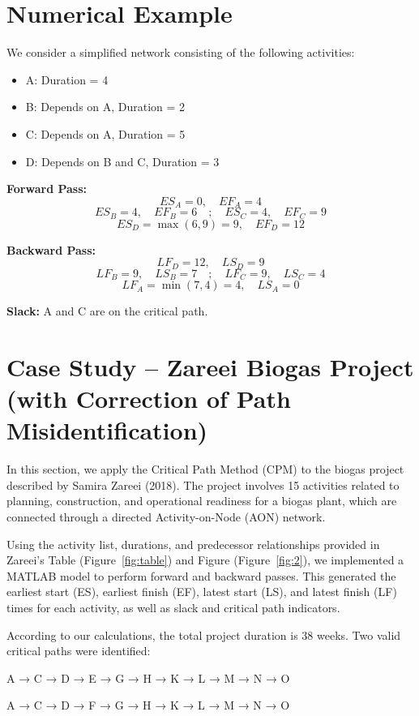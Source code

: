 \documentclass[12pt]{article}
\begin{document}
\section{Numerical Example}
We consider a simplified network consisting of the following activities:

\begin{itemize}
    \item A: Duration = 4
    \item B: Depends on A, Duration = 2
    \item C: Depends on A, Duration = 5
    \item D: Depends on B and C, Duration = 3
\end{itemize}

\textbf{Forward Pass:}
\[
ES_A = 0, \quad EF_A = 4
\]
\[
ES_B = 4, \quad EF_B = 6 \quad ; \quad ES_C = 4, \quad EF_C = 9
\]
\[
ES_D = \max(6,9) = 9, \quad EF_D = 12
\]

\textbf{Backward Pass:}
\[
LF_D = 12, \quad LS_D = 9
\]
\[
LF_B = 9, \quad LS_B = 7 \quad ; \quad LF_C = 9, \quad LS_C = 4
\]
\[
LF_A = \min(7,4) = 4, \quad LS_A = 0
\]

\textbf{Slack:} A and C are on the critical path.

\section{Case Study – Zareei Biogas Project (with Correction of Path Misidentification)}
In this section, we apply the Critical Path Method (CPM) to the biogas project described by Samira Zareei (2018). The project involves 15 activities related to planning, construction, and operational readiness for a biogas plant, which are connected through a directed Activity-on-Node (AON) network.

Using the activity list, durations, and predecessor relationships provided in Zareei's Table (Figure~\ref{fig:table}) and Figure (Figure~\ref{fig:2}), we implemented a MATLAB model to perform forward and backward passes. This generated the earliest start (ES), earliest finish (EF), latest start (LS), and latest finish (LF) times for each activity, as well as slack and critical path indicators.

According to our calculations, the total project duration is 38 weeks. Two valid critical paths were identified:

A → C → D → E → G → H → K → L → M → N → O

A → C → D → F → G → H → K → L → M → N → O
\end{document}

